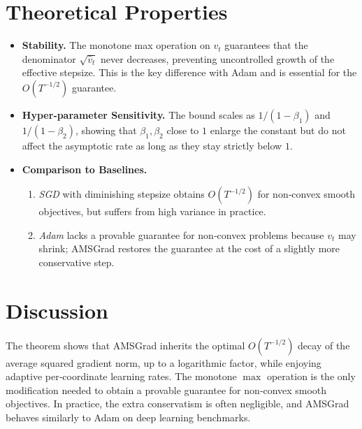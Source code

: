 \documentclass{article}
\begin{document}
\section*{Theoretical Properties}
\begin{itemize}[leftmargin=*]
\item \textbf{Stability.} The monotone max operation on $v_{t}$ guarantees that the denominator $\sqrt{\hat v_{t}}$ never decreases, preventing uncontrolled growth of the effective stepsize. This is the key difference with Adam and is essential for the $O(T^{-1/2})$ guarantee.
\item \textbf{Hyper‑parameter Sensitivity.} The bound scales as $1/(1-\beta_{1})$ and $1/(1-\beta_{2})$, showing that $\beta_{1},\beta_{2}$ close to $1$ enlarge the constant but do not affect the asymptotic rate as long as they stay strictly below $1$.
\item \textbf{Comparison to Baselines.}
    \begin{enumerate}
        \item \emph{SGD} with diminishing stepsize obtains $O(T^{-1/2})$ for non‑convex smooth objectives, but suffers from high variance in practice.
        \item \emph{Adam} lacks a provable guarantee for non‑convex problems because $v_{t}$ may shrink; AMSGrad restores the guarantee at the cost of a slightly more conservative step.
    \end{enumerate}
\end{itemize}

\section*{Discussion}
The theorem shows that AMSGrad inherits the optimal $O(T^{-1/2})$ decay of the average squared gradient norm, up to a logarithmic factor, while enjoying adaptive per‑coordinate learning rates. The monotone $\max$ operation is the only modification needed to obtain a provable guarantee for non‑convex smooth objectives. In practice, the extra conservatism is often negligible, and AMSGrad behaves similarly to Adam on deep learning benchmarks.
\end{document}
